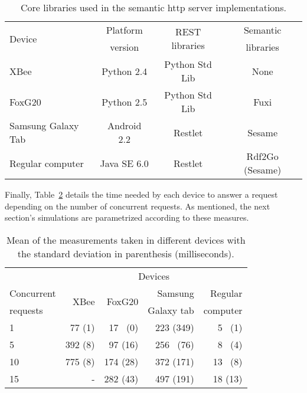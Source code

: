 \begin{table}
  \caption{Core libraries used in the semantic \acs{http} server implementations.}
  \small
  \label{tab:deviceslibraries}
  \begin{center}
    \begin{tabular}{lccc}
      \hline
      \multirow{2}{*}{Device} & ~Platform~ & \multirow{2}{*}{REST libraries} & ~~Semantic~~ \\
      ~ & version & ~ & libraries \\
      \hline
      XBee & Python 2.4 & Python Std Lib & None \\
      FoxG20 & Python 2.5 &  Python Std Lib & Fuxi \\
      Samsung Galaxy Tab & Android 2.2 & Restlet & Sesame \\
      Regular computer & Java SE 6.0 & Restlet & Rdf2Go (Sesame) \\
      \hline
    \end{tabular}
  \end{center}
\end{table}


Finally, Table~\ref{tab:measures_embedded} details the time needed by each device to answer a request depending on the number of concurrent requests.
As mentioned, the next section's simulations are parametrized according to these measures.

\begin{table}
  \caption{Mean of the measurements taken in different devices with the standard deviation in parenthesis (milliseconds).}
  \begin{center}
	\begin{tabular}{p{2.5cm} r r r r}
	  \hline
	  & \multicolumn{4}{c}{Devices} \\
	  \cline{2-5}
	  Concurrent & \multirow{2}{*}{XBee} & \multirow{2}{*}{FoxG20} & Samsung & Regular  \\
	  requests   &  ~    &   ~     & Galaxy tab & computer \\
	  \hline
	  1  &  77 (1)	&  17 ~(0)  &  223 (349) &   5 ~(1) \\
	  5  & 392 (8)	&  97 (16)  &  256 ~(76) &   8 ~(4)  \\
	  10 & 775 (8)	& 174 (28)  &  372 (171) &  13 ~(8) \\
	  15 &  -   	& 282 (43)  &  497 (191) &  18 (13) \\
	  \hline
	\end{tabular}
  \end{center}
  \label{tab:measures_embedded}
\end{table}


